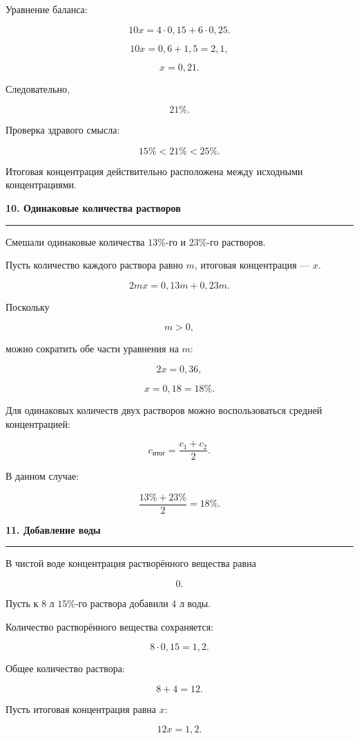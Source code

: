 \documentclass[a4paper,12pt]{article}
\newcommand{\topic}[1]{%
    \vspace{0.5em}
    {\Large\bfseries\color{darkaccent}#1}\par
    \vspace{0.25em}
    {\color{accent!55}\rule{\linewidth}{0.6pt}}\par
    \vspace{0.45em}
}
\begin{document}
Уравнение баланса:

\[
10x=4\cdot0{,}15+6\cdot0{,}25.
\]

\[
10x=0{,}6+1{,}5=2{,}1,
\]

\[
x=0{,}21.
\]

Следовательно,

\[
\boxed{21\%}.
\]

Проверка здравого смысла:

\[
15\%<21\%<25\%.
\]

Итоговая концентрация действительно расположена между исходными концентрациями.


\topic{10. Одинаковые количества растворов}

Смешали одинаковые количества $13\%$-го и $23\%$-го растворов.

Пусть количество каждого раствора равно $m$, итоговая концентрация --- $x$.

\[
2mx=0{,}13m+0{,}23m.
\]

Поскольку

\[
m>0,
\]

можно сократить обе части уравнения на $m$:

\[
2x=0{,}36,
\]

\[
\boxed{x=0{,}18=18\%}.
\]

Для одинаковых количеств двух растворов можно воспользоваться средней концентрацией:

\[
\boxed{
c_{\text{итог}}
=
\frac{c_1+c_2}{2}
}.
\]

В данном случае:

\[
\frac{13\%+23\%}{2}=18\%.
\]


\topic{11. Добавление воды}

В чистой воде концентрация растворённого вещества равна

\[
\boxed{0}.
\]

Пусть к $8$ л $15\%$-го раствора добавили $4$ л воды.

Количество растворённого вещества сохраняется:

\[
8\cdot0{,}15=1{,}2.
\]

Общее количество раствора:

\[
8+4=12.
\]

Пусть итоговая концентрация равна $x$:

\[
12x=1{,}2.
\]
\end{document}
